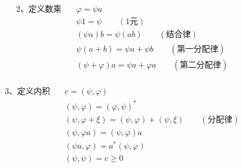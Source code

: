 \begin{frame} 
    \begin{equation*}
        \begin{split}
            \text{2、定义数乘} \quad &\varphi=\psi a\\
            &\psi 1= \psi \qquad (\text{1元})\\
            &(\psi a)b=\psi (ab) \qquad (\text{结合律})\\
            &\psi(a+b)= \psi a+ \psi b \qquad (\text{第一分配律})\\
            &(\psi+\varphi) a= \psi a +\varphi a \qquad (\text{第二分配律})\\
        \end{split}  
    \end{equation*}
\end{frame} 

\begin{frame} 
    \begin{equation*}
        \begin{split}
            \text{3、定义内积} \quad &c=(\psi, \varphi)\\
            &(\psi, \varphi)= (\varphi,\psi)^* \\
            &(\psi, \varphi+\xi)= (\psi, \varphi) + (\psi, \xi)\qquad (\text{分配律})\\
            &(\psi, \varphi a)= (\psi, \varphi )a \\
            &(\psi a, \varphi )= a^* (\psi, \varphi ) \\
            &(\psi,\psi)= c\ge 0\\
        \end{split}  
    \end{equation*}
\end{frame}

